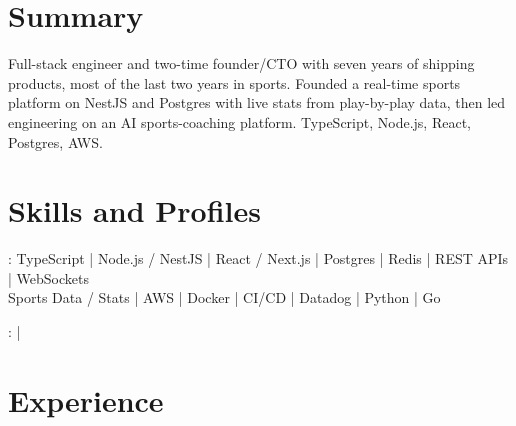\documentclass[print]{jack-resume}
\begin{document}
\pagecolor{darkmodeBackground}


\begin{minipage}[t][1cm][t]{.03\textwidth}
    \hfill
\end{minipage}

\section{Summary}
Full-stack engineer and two-time founder/CTO with seven years of shipping products, most of the last two years in sports. Founded a real-time sports platform on NestJS and Postgres with live stats from play-by-play data, then led engineering on an AI sports-coaching platform. TypeScript, Node.js, React, Postgres, AWS.
\sectionsep

\section{Skills and Profiles}
:
TypeScript \hfill | \hfill
Node.js / NestJS \hfill | \hfill
React / Next.js \hfill | \hfill
Postgres \hfill | \hfill
Redis \hfill | \hfill
REST APIs \hfill | \hfill
WebSockets \\
\hspace{1.0cm} Sports Data / Stats \hfill | \hfill
AWS \hfill | \hfill
Docker \hfill | \hfill
CI/CD \hfill | \hfill
Datadog \hfill | \hfill
Python \hfill | \hfill
Go \\

\raggedright{
    :
      \href{https://www.linkedin.com/in/jack-sturtevant/}{ \ExternalLink} |
     \href{https://github.com/jacksturt}{ \ExternalLink}}

\section{Experience}
\end{document}
